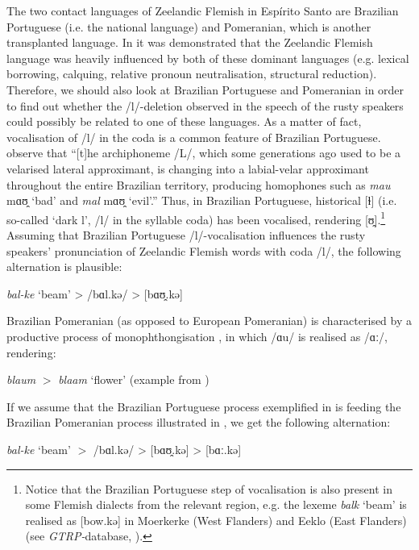 \documentclass[output=paper,hidelinks,draftmode]{langscibook}
\begin{document}
The two contact languages of Zeelandic Flemish in Espírito Santo are Brazilian Portuguese (i.e. the national language) and Pomeranian, which is another transplanted language. In \citet{SchaffelBremenkampPostma2017} it was demonstrated that the Zeelandic Flemish language was heavily influenced by both of these dominant languages (e.g. lexical borrowing, calquing, relative pronoun neutralisation, structural reduction). Therefore, we should also look at Brazilian Portuguese and Pomeranian in order to find out whether the /l/-deletion observed in the speech of the rusty speakers could possibly be related to one of these languages. As a matter of fact, vocalisation of /l/ in the coda is a common feature of Brazilian Portuguese. \citet[229]{BarbosaAlbano2004} observe that “[t]he archiphoneme /L/, which some generations ago used to be a velarised lateral approximant, is changing into a labial-velar approximant throughout the entire Brazilian territory, producing homophones such as \textit{mau} mɑʊ̯ ‘bad’ and \textit{mal} mɑʊ̯ ‘evil’.”
\largerpage[-1]
Thus, in Brazilian Portuguese, historical {[ɫ] (i.e. so-called ‘dark l’, /l/ in the syllable coda) has been vocalised, rendering [ʊ̯].}\footnote{ {Notice that the Brazilian Portuguese step of vocalisation is also present in some Flemish dialects from the relevant region, e.g. the lexeme} {\textit{balk} }{‘beam’ is realised as} {{[b}}{ow.kə}{]} {in Moerkerke (West Flanders) and Eeklo (East Flanders) (see} {\textit{GTRP-}}{database, \citealt{DeSchutterJong2005}).}}{ Assuming that Brazilian Portuguese /l/-vocalisation influences the rusty speakers’ pronunciation of Zeelandic Flemish words with coda /l/, the following alternation is plausible:}


\ea 
\label{ex:schaffel:26}
{\textit{bal-ke} ‘beam’ > /b}ɑl.kə{/ > [b}ɑ{ʊ̯}.kə{]}
\z 

{Brazilian Pomeranian (as opposed to European Pomeranian) is characterised by a productive process of monophthongisation \citep[56]{Postma2019}, in which /ɑu/ is realised as /ɑː/, rendering:}


\ea 
\label{ex:schaffel:27}
{\textit{blaum} $>$ \textit{blaam} ‘flower’ (example from \citealt[56]{Postma2019})}
\z 

If we assume that the Brazilian Portuguese process exemplified in  is feeding the Brazilian Pomeranian process illustrated in , we get the following alternation:

\ea 
\label{ex:schaffel:28}
{\textit{bal-ke} ‘beam’ $>$ /b}ɑl.kə{/ > [b}ɑ{ʊ̯}.kə{] > [b}ɑ{ː}.kə{]}
\z 
\end{document}
